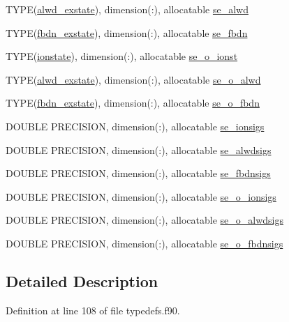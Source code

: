 \begin{DoxyCompactItemize}
TYPE(\hyperlink{typetypedefs_1_1alwd__exstate}{alwd\_\-exstate}), dimension(:), allocatable \hyperlink{typetypedefs_1_1se__info_a208e6628ee7993cd5df24be28c3835fc}{se\_\-alwd}
\item 
TYPE(\hyperlink{typetypedefs_1_1fbdn__exstate}{fbdn\_\-exstate}), dimension(:), allocatable \hyperlink{typetypedefs_1_1se__info_ae86fd99616525aef71601e1c8036f11a}{se\_\-fbdn}
\item 
TYPE(\hyperlink{typetypedefs_1_1ionstate}{ionstate}), dimension(:), allocatable \hyperlink{typetypedefs_1_1se__info_abba4b9ad7d6f0faa147726c8a41903d0}{se\_\-o\_\-ionst}
\item 
TYPE(\hyperlink{typetypedefs_1_1alwd__exstate}{alwd\_\-exstate}), dimension(:), allocatable \hyperlink{typetypedefs_1_1se__info_a838335cf3aac3f755cf712eafa14c9e0}{se\_\-o\_\-alwd}
\item 
TYPE(\hyperlink{typetypedefs_1_1fbdn__exstate}{fbdn\_\-exstate}), dimension(:), allocatable \hyperlink{typetypedefs_1_1se__info_a5acf75a4e3c255609d5d7b6e079e2ef1}{se\_\-o\_\-fbdn}
\item 
DOUBLE PRECISION, dimension(:), allocatable \hyperlink{typetypedefs_1_1se__info_a22bb3ce5a09c2ad12c553e3b427ec812}{se\_\-ionsigs}
\item 
DOUBLE PRECISION, dimension(:), allocatable \hyperlink{typetypedefs_1_1se__info_a8d0aa801ea2e0abab6173ad6eb3310c1}{se\_\-alwdsigs}
\item 
DOUBLE PRECISION, dimension(:), allocatable \hyperlink{typetypedefs_1_1se__info_a358b552703647e88a165b6523d1e4daa}{se\_\-fbdnsigs}
\item 
DOUBLE PRECISION, dimension(:), allocatable \hyperlink{typetypedefs_1_1se__info_adace414a14734324000a3b05920e1c3d}{se\_\-o\_\-ionsigs}
\item 
DOUBLE PRECISION, dimension(:), allocatable \hyperlink{typetypedefs_1_1se__info_a0b5d9872f495081658c1545f6b014a08}{se\_\-o\_\-alwdsigs}
\item 
DOUBLE PRECISION, dimension(:), allocatable \hyperlink{typetypedefs_1_1se__info_a12be38b49ef5d0878b370e8f15737e0f}{se\_\-o\_\-fbdnsigs}
\end{DoxyCompactItemize}


\subsection{Detailed Description}


Definition at line 108 of file typedefs.f90.

